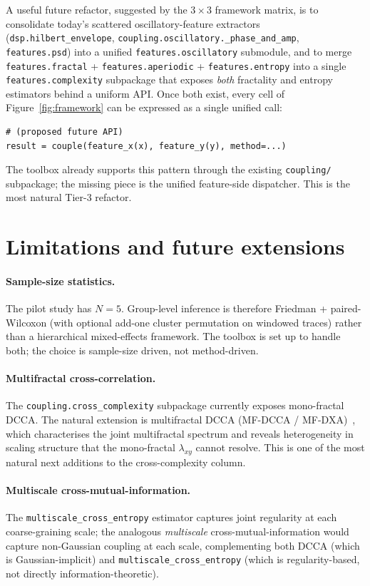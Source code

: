 \documentclass[11pt,a4paper]{article}
\begin{document}
A useful future refactor, suggested by the \(3 \times 3\) framework
matrix, is to consolidate today's scattered oscillatory-feature
extractors (\texttt{dsp.hilbert\_envelope},
\texttt{coupling.oscillatory.\_phase\_and\_amp},
\texttt{features.psd}) into a unified \texttt{features.oscillatory}
submodule, and to merge \texttt{features.fractal} +
\texttt{features.aperiodic} + \texttt{features.entropy} into a single
\texttt{features.complexity} subpackage that exposes \emph{both}
fractality and entropy estimators behind a uniform API. Once both
exist, every cell of Figure~\ref{fig:framework} can be expressed as a
single unified call:
\begin{lstlisting}
# (proposed future API)
result = couple(feature_x(x), feature_y(y), method=...)
\end{lstlisting}
The toolbox already supports this pattern through the existing
\texttt{coupling/} subpackage; the missing piece is the unified
feature-side dispatcher. This is the most natural Tier-3 refactor.

\section{Limitations and future extensions}
\label{sec:future}

\paragraph{Sample-size statistics.} The pilot study has $N\!=\!5$.
Group-level inference is therefore Friedman + paired-Wilcoxon (with
optional add-one cluster permutation on windowed traces) rather than a
hierarchical mixed-effects framework. The toolbox is set up to handle
both; the choice is sample-size driven, not method-driven.

\paragraph{Multifractal cross-correlation.} The
\texttt{coupling.cross\_complexity} subpackage currently exposes
mono-fractal DCCA. The natural extension is multifractal DCCA
(MF-DCCA / MF-DXA)~\cite{Zhou2008}, which characterises the joint
multifractal spectrum and reveals heterogeneity in scaling structure
that the mono-fractal $\lambda_{xy}$ cannot resolve. This is one of
the most natural next additions to the cross-complexity column.

\paragraph{Multiscale cross-mutual-information.} The
\texttt{multiscale\_cross\_entropy} estimator captures joint
regularity at each coarse-graining scale; the analogous
\emph{multiscale} cross-mutual-information would capture
non-Gaussian coupling at each scale, complementing both DCCA (which
is Gaussian-implicit) and \texttt{multiscale\_cross\_entropy} (which
is regularity-based, not directly information-theoretic).
\end{document}
